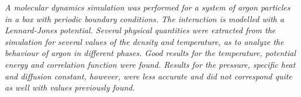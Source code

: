 \emph{A molecular dynamics simulation was performed for a system of argon particles in a box with periodic boundary conditions. The interaction is modelled with a Lennard-Jones potential. Several physical quantities were extracted from the simulation for several values of the density and temperature, as to analyze the behaviour of argon in different phases. Good results for the temperature, potential energy and correlation function were found. Results for the pressure, specific heat and diffusion constant, however, were less accurate and did not correspond quite as well with values previously found.}